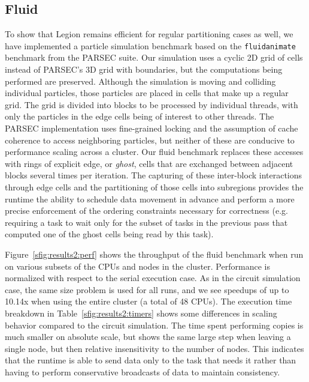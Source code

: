 

\subsection{Fluid}

To show that Legion remains efficient for regular partitioning cases as well,
we have implemented a particle simulation benchmark based on the
{\tt fluidanimate} benchmark from the PARSEC \cite{bienia11benchmarking} suite.
Our simulation uses a cyclic 2D grid of cells instead of PARSEC's 3D grid with
boundaries, but the computations being performed are preserved.
Although the 
simulation is moving and colliding individual particles, those particles
are placed in cells that make up a regular grid.  The grid is
divided into blocks to be processed by individual threads, with only the
particles in the edge cells being of interest to other threads.  The PARSEC
implementation uses fine-grained locking and the assumption of cache
coherence to access neighboring particles, but neither of these are conducive
to performance scaling across a cluster.  Our fluid benchmark replaces these
accesses with rings of
explicit edge, or \emph{ghost}, cells that are exchanged between adjacent
blocks several times per iteration.  The capturing of these inter-block
interactions through edge cells and the partitioning of those cells into
subregions provides the runtime the ability to schedule data movement in
advance and perform a more precise enforcement of the ordering
constraints necessary for correctness (e.g.
requiring a task to wait only for the subset of tasks in the previous pass 
that computed one of the ghost cells being read by this task).

Figure~\ref{sfig:results2:perf} shows the throughput of the fluid benchmark when
run on various subsets of the CPUs and nodes in the cluster.  Performance is
normalized with respect to the serial execution case.  As in the circuit
simulation case, the same size problem is used for all runs, and we see 
speedups of up to 10.14x when using the entire cluster (a total of 48 CPUs).
The execution time breakdown in Table~\ref{sfig:results2:timers} shows some
differences in scaling behavior compared to the circuit simulation.  The time
spent performing copies is much smaller on absolute scale, but shows the same
large step when leaving a single node, but then relative insensitivity to the
number of nodes.  This indicates that the runtime is able to send data only to
the task that needs it rather than having to perform conservative broadcasts of
data to maintain consistency.

